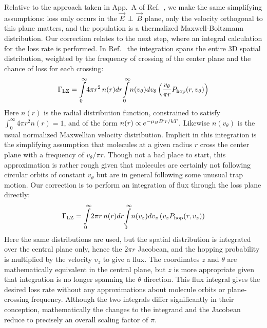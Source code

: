 \documentclass[%
 reprint,
 amsmath,amssymb,
 aps,
pra,
]{revtex4-1}
\newcommand{\epb}{{$\vec{E}\,{\perp}\,\vec{B}$}}
\begin{document}
Relative to the approach taken in App.~A of Ref.~\cite{Stuhl2013}, we make the same simplifying assumptions: loss only occurs in the \epb{} plane, only the velocity orthogonal to this plane matters, and the population is a thermalized Maxwell-Boltzmann distribution.
Our correction relates to the next step, where an integral calculation for the loss rate is performed.
In Ref.~\cite{Stuhl2013} the integration spans the entire 3D spatial distribution, weighted by the frequency of crossing of the center plane and the chance of loss for each crossing:
\begin{equation}
\Gamma_\text{LZ}=\int\displaylimits_0^\infty\!4\pi r^2\,n(r)dr\!\int\displaylimits_0^\infty \!n(v_\theta)dv_\theta\left( \frac{v_\theta}{\pi r} P_\text{hop}(r,v_\theta)\right)
\end{equation}
Here $n(r)$ is the radial distribution function, constrained to satisfy $\int_0^\infty 4\pi r^2n(r)=1$, and of the form $n(r)\propto e^{-\mu_BB`r/kT}$. 
Likewise $n(v_\theta)$ is the usual normalized Maxwellian velocity distribution. 
Implicit in this integration is the simplifying assumption that molecules at a given radius $r$ cross the center plane with a frequency of $v_\theta/\pi r$.
Though not a bad place to start, this approximation is rather rough given that molecules are certainly not following circular orbits of constant $v_\theta$ but are in general following some unusual trap motion.
Our correction is to perform an integration of flux through the loss plane directly:
\begin{equation}
\Gamma_\text{LZ}=\int\displaylimits_0^\infty\!2\pi r \,n(r)dr\!\int\displaylimits_0^\infty\! n(v_z)dv_z\left(v_z P_\text{hop}(r,v_z)\right)
\end{equation}
Here the same distributions are used, but the spatial distribution is integrated over the central plane only, hence the $2\pi r$ Jacobean, and the hopping probability is multiplied by the velocity $v_z$ to give a flux.
The coordinates $z$ and $\theta$ are mathematically equivalent in the central plane, but $z$ is more appropriate given that integration is no longer spanning the $\theta$ direction.
This flux integral gives the desired loss rate without any approximations about molecule orbits or plane-crossing frequency.
Although the two integrals differ significantly in their conception, mathematically the changes to the integrand and the Jacobean reduce to precisely an overall scaling factor of $\pi$.
\end{document}

